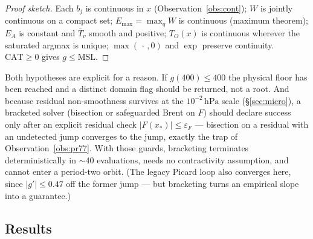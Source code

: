 \documentclass[11pt,a4paper]{article}
\theoremstyle{definition}
\newcommand{\Emax}{E_{\mathrm{max}}}
\newcommand{\hPa}{\,\mathrm{hPa}}
\begin{document}
\begin{proof}[Proof sketch]
Each $b_j$ is continuous in $x$ (Observation~\ref{obs:cont}); $W$ is jointly
continuous on a compact set; $\Emax=\max_qW$ is continuous (maximum
theorem); $E_A$ is constant and $\overline T_v$ smooth and positive;
$T_O(x)$ is continuous wherever the saturated argmax is unique;
$\max(\,\cdot\,,0)$ and $\exp$ preserve continuity.  $\mathrm{CAT}\ge0$
gives $g\le\mathrm{MSL}$.
\end{proof}

Both hypotheses are explicit for a reason.  If $g(400)\le400$ the physical
floor has been reached and a distinct domain flag should be returned, not a
root.  And because residual non-smoothness survives at the $10^{-2}\hPa$
scale (\S\ref{sec:micro}), a bracketed solver (bisection or safeguarded
Brent on $F$) should declare success only after an explicit residual check
$|F(x_*)|\le\varepsilon_F$ --- bisection on a residual with an undetected
jump converges to the jump, exactly the trap of Observation~\ref{obs:pr77}.
With those guards, bracketing terminates deterministically in $\sim40$
evaluations, needs no contractivity assumption, and cannot enter a
period-two orbit.  (The legacy Picard loop also converges here, since
$|g'|\le0.47$ off the former jump --- but bracketing turns an empirical
slope into a guarantee.)

\subsection{Results}
\end{document}
